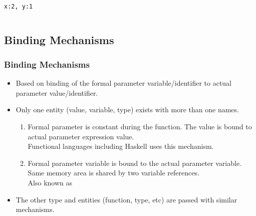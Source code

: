 \begin{frame}
\begin{columns}
\begin{column}{.45\linewidth}
{ \ \\
\texttt{x:2, y:1}\\}
\end{column}
\end{columns}
\end{frame}

\subsection{Binding Mechanisms}
\begin{frame}
\frametitle{Binding Mechanisms}
 \begin{itemize}
  \item  Based on binding of the formal parameter variable/identifier to actual parameter
value/identifier.
  \item Only one entity (value, variable, type) exists with more than one names.
\begin{enumerate}
  \item {} Formal parameter is constant during the function. The
value is bound to actual parameter expression value. \\
  Functional languages including Haskell uses this mechanism.
  \item {} Formal parameter variable is bound to the actual
parameter variable. Same memory area is shared by two variable references.\\
  Also known as  \\
\end{enumerate}
  \item The other type and entities (function, type, etc) are passed with similar mechanisms. 
\end{itemize}
\end{frame}


